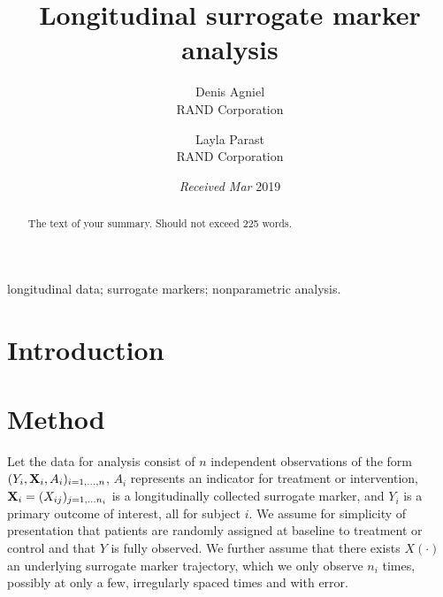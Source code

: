 \documentclass[useAMS,usenatbib,referee]{biom}
\title[]{Longitudinal surrogate marker analysis}
\author{ Denis Agniel \email{\href{mailto:dagniel@rand.org}{\nolinkurl{dagniel@rand.org}}} \\ RAND Corporation  \and
		 Layla Parast \email{\href{mailto:parast@rand.org}{\nolinkurl{parast@rand.org}}} \\ RAND Corporation 
	   }
\begin{document}
\date{{\it Received Mar} 2019}

\pagerange{\pageref{firstpage}--\pageref{lastpage}} 



\label{firstpage}


\begin{abstract}
The text of your summary. Should not exceed 225 words.
\end{abstract}

%
%

\begin{keywords}
longitudinal data; surrogate markers; nonparametric analysis.
\end{keywords}

\maketitle

  \def\sone{^{(1)}} \def\szero{^{(0)}}

\section{Introduction}\label{intro}

\section{Method}\label{sec:1}

Let the data for analysis consist of \(n\) independent observations of
the form \((Y_i, {\bf X}_i, A_i)_{i=1, ..., n}\), \(A_i\) represents an
indicator for treatment or intervention,
\({\bf X}_i = (X_{ij})_{j=1, ... n_i}\) is a longitudinally collected
surrogate marker, and \(Y_i\) is a primary outcome of interest, all for
subject \(i\). We assume for simplicity of presentation that patients
are randomly assigned at baseline to treatment or control and that \(Y\)
is fully observed. We further assume that there exists \(X(\cdot)\) an
underlying surrogate marker trajectory, which we only observe \(n_i\)
times, possibly at only a few, irregularly spaced times and with error.
\end{document}
